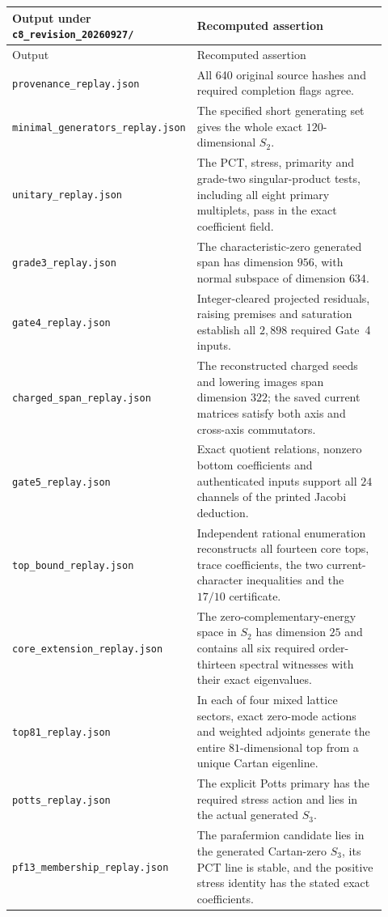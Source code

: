 \documentclass[11pt,a4paper]{article}
\theoremstyle{definition}
\newcommand{\artifact}[1]{\textnormal{\nolinkurl{#1}}}
\begin{document}
\begin{longtable}{@{}p{0.38\linewidth}p{0.54\linewidth}@{}}
\toprule
Output under \artifact{c8_revision_20260927/} & Recomputed assertion\\
\midrule\endfirsthead
\toprule Output & Recomputed assertion\\\midrule\endhead
\bottomrule\endfoot
\artifact{provenance_replay.json} & All 640 original source hashes and
required completion flags agree.\\
\artifact{minimal_generators_replay.json} & The specified short
generating set gives the whole exact $120$-dimensional $S_2$.\\
\artifact{unitary_replay.json} & The PCT, stress, primarity and
grade-two singular-product tests, including all eight primary
multiplets, pass in the exact coefficient field.\\
\artifact{grade3_replay.json} & The characteristic-zero generated
span has dimension $956$, with normal subspace of dimension $634$.\\
\artifact{gate4_replay.json} & Integer-cleared projected residuals,
raising premises and saturation establish all $2,898$ required
Gate~4 inputs.\\
\artifact{charged_span_replay.json} & The reconstructed charged
seeds and lowering images span dimension $322$; the saved current
matrices satisfy both axis and cross-axis commutators.\\
\artifact{gate5_replay.json} & Exact quotient relations, nonzero
bottom coefficients and authenticated inputs support all $24$
channels of the printed Jacobi deduction.\\
\artifact{top_bound_replay.json} & Independent rational enumeration
reconstructs all fourteen core tops, trace coefficients, the two
current-character inequalities and the $17/10$ certificate.\\
\artifact{core_extension_replay.json} & The zero-complementary-energy
space in $S_2$ has dimension $25$ and contains all six required
order-thirteen spectral witnesses with their exact eigenvalues.\\
\artifact{top81_replay.json} & In each of four mixed lattice sectors,
exact zero-mode actions and weighted adjoints generate the entire
$81$-dimensional top from a unique Cartan eigenline.\\
\artifact{potts_replay.json} & The explicit Potts primary has the
required stress action and lies in the actual generated $S_3$.\\
\artifact{pf13_membership_replay.json} & The parafermion candidate
lies in the generated Cartan-zero $S_3$, its PCT line is stable,
and the positive stress identity has the stated exact coefficients.\\
\end{longtable}
\end{document}
